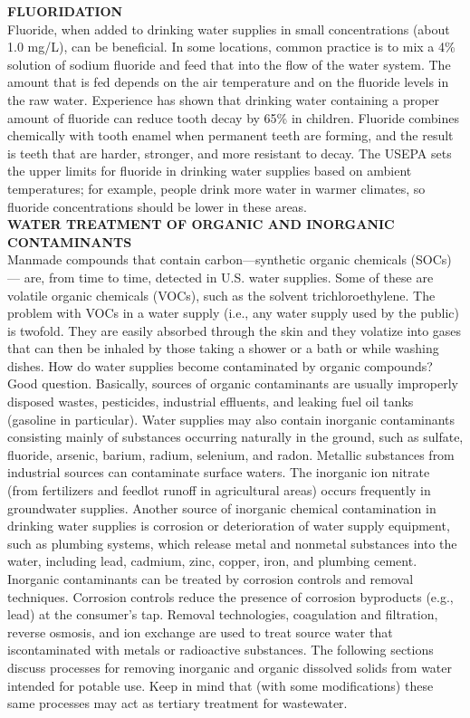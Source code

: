 \textbf{FLUORIDATION}\\
Fluoride, when added to drinking water supplies in small concentrations (about 1.0 mg/L), can be beneficial. In some locations, common practice is to mix a 4\% solution of sodium fluoride and feed that into the flow of the water system. The amount that is fed depends on the air temperature and on the fluoride levels in the raw water. Experience has shown that drinking water containing a proper amount of fluoride can reduce tooth decay by 65\% in children. Fluoride combines chemically with tooth enamel when permanent teeth are forming, and the result is teeth that are harder, stronger, and more resistant to decay. The USEPA sets the upper limits for fluoride in drinking water supplies based on ambient temperatures; for example, people drink more water in warmer climates, so fluoride concentrations should be lower in these areas.\\

\textbf{WATER TREATMENT OF ORGANIC AND INORGANIC CONTAMINANTS}\\
Manmade compounds that contain carbon—synthetic organic chemicals (SOCs)— are, from time to time, detected in U.S. water supplies. Some of these are volatile organic chemicals (VOCs), such as the solvent trichloroethylene. The problem with VOCs in a water supply (i.e., any water supply used by the public) is twofold. They are easily absorbed through the skin and they volatize into gases that can then be inhaled by those taking a shower or a bath or while washing dishes. How do water supplies become contaminated by organic compounds? Good question. Basically, sources of organic contaminants are usually improperly disposed wastes, pesticides, industrial effluents, and leaking fuel oil tanks (gasoline in particular).
Water supplies may also contain inorganic contaminants consisting mainly of substances occurring naturally in the ground, such as sulfate, fluoride, arsenic, barium, radium, selenium, and radon. Metallic substances from industrial sources can contaminate surface waters. The inorganic ion nitrate (from fertilizers and feedlot runoff in agricultural areas) occurs frequently in groundwater supplies. Another source of inorganic chemical contamination in drinking water supplies is corrosion or deterioration of water supply equipment, such as plumbing systems, which release metal and nonmetal substances into the water, including lead, cadmium, zinc, copper, iron, and plumbing cement. Inorganic contaminants can be treated by corrosion controls and removal techniques. Corrosion controls reduce the presence of corrosion byproducts (e.g., lead) at the consumer’s tap. Removal technologies, coagulation and filtration, reverse osmosis, and ion exchange are used to treat source water that iscontaminated with metals or radioactive substances. The following sections discuss processes for removing inorganic and organic dissolved solids from water intended for potable use. Keep in mind that (with some modifications) these same processes may act as tertiary treatment for wastewater.\\
 


